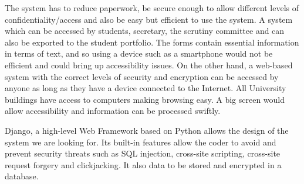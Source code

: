 \documentclass[../main.tex]{subfiles}
\begin{document}
\raggedright
The system has to reduce paperwork, be secure enough to allow different levels of confidentiality/access and also be easy but efficient to use the system. A system which can be accessed by students, secretary, the scrutiny committee and can also be exported to the student portfolio. The forms contain essential information in terms of text, and so using a device such as a smartphone would not be efficient and could bring up accessibility issues. On the other hand, a web-based system with the correct levels of security and encryption can be accessed by anyone as long as they have a device connected to the Internet. All University buildings have access to computers making browsing easy. A big screen would allow accessibility and information can be processed swiftly.

Django\cite{django}, a high-level Web Framework based on Python allows the design of the system we are looking for. Its built-in features allow the coder to avoid and prevent security threats such as SQL injection, cross-site scripting, cross-site request forgery and clickjacking\cite{django}. It also data to be stored and encrypted in a database.
\end{document}
